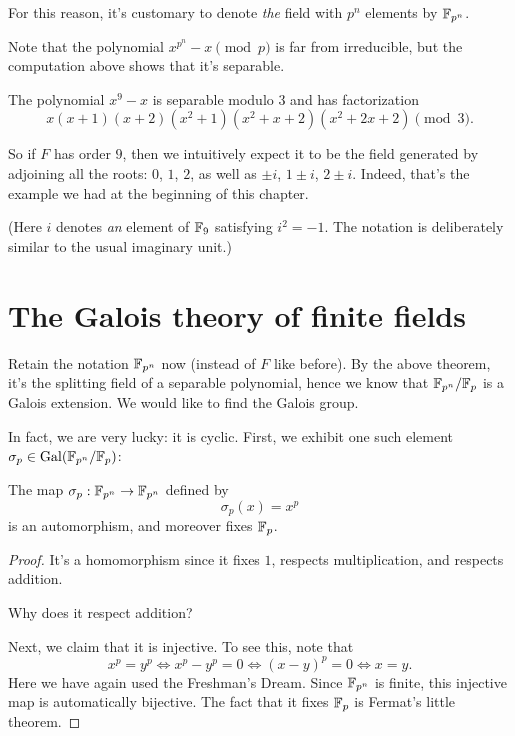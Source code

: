 \begin{definition}
	For this reason, it's customary to denote \emph{the}
	field with $p^n$ elements by $\mathbb F_{p^n}$.
\end{definition}

Note that the polynomial $x^{p^n}-x \pmod p$ is far from irreducible, but
the computation above shows that it's separable.
\begin{example}
	The polynomial $x^9-x$ is separable modulo $3$ and has factorization
	\[ x(x+1)(x+2)(x^2+1)(x^2+x+2)(x^2+2x+2) \pmod 3. \]

	So if $F$ has order $9$, then we intuitively expect it to be the field
	generated by adjoining all the roots: $0$, $1$, $2$, as well as
	$\pm i$, $1 \pm i$, $2 \pm i$.
	Indeed, that's the example we had at the beginning of this chapter.

	(Here $i$ denotes \emph{an} element of $\mathbb F_9$ satisfying $i^2=-1$.
	The notation is deliberately similar to the usual imaginary unit.)
\end{example}

\section{The Galois theory of finite fields}
Retain the notation $\mathbb F_{p^n}$ now (instead of $F$ like before).
By the above theorem, it's the splitting field of a separable polynomial,
hence we know that $\mathbb F_{p^n} /\mathbb F_p$ is a Galois extension.
We would like to find the Galois group.

In fact, we are very lucky: it is cyclic.
First, we exhibit one such element $\sigma_p \in \operatorname{Gal}(\mathbb F_{p^n} /\mathbb F_p)$:

\begin{theorem}
	The map $\sigma_p : \mathbb F_{p^n} \to \mathbb F_{p^n}$ defined by
	\[ \sigma_p(x) = x^p \]
	is an automorphism, and moreover fixes $\mathbb F_p$.
\end{theorem}
\begin{proof}
	It's a homomorphism since it fixes $1$,
	respects multiplication,
	and respects addition.
	\begin{ques}
		Why does it respect addition?
	\end{ques}
	Next, we claim that it is injective. To see this, note that
	\[ x^p = y^p
		\iff x^p - y^p = 0
		\iff (x-y)^p = 0
		\iff x=y.
	\]
	Here we have again used the Freshman's Dream.
	Since $\mathbb F_{p^n}$ is finite, this injective map is automatically bijective.
	The fact that it fixes $\mathbb F_p$ is Fermat's little theorem.
\end{proof}

